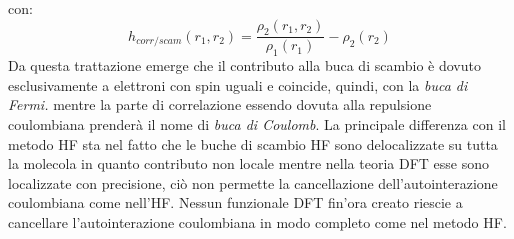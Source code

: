 \documentclass[oneside]{amsbook}
\numberwithin{section}{chapter}
\numberwithin{equation}{section}
\numberwithin{figure}{section}
\begin{document}
con:
\begin{equation}
 h_{corr/scam}(r_1, r_2)= \frac{ \rho_2(r_1,r_2)}{ \rho_1(r_1)}- \rho_2(r_2)
\end{equation}
Da questa trattazione emerge che il contributo alla buca di scambio è dovuto esclusivamente a elettroni con spin uguali e coincide, quindi, con la \emph{buca di 
Fermi.} mentre la parte di correlazione essendo dovuta alla repulsione coulombiana prenderà il nome di \emph{buca di Coulomb}. 
La principale differenza con il metodo HF sta nel fatto che le buche di scambio HF sono delocalizzate su tutta la molecola in quanto contributo non locale mentre nella teoria DFT esse sono localizzate con precisione, ciò non permette la cancellazione dell'autointerazione coulombiana come nell'HF. Nessun funzionale DFT fin'ora creato riescie a cancellare l'autointerazione coulombiana in modo completo come nel metodo HF.
\end{document}

